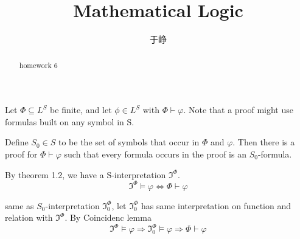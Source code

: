 \documentclass{ximera}
\begin{document}
\title{Mathematical Logic}
\author{于峥}

\begin{abstract}
    homework 6
\end{abstract}
\maketitle

\begin{problem} Let $\Phi \subseteq L^S$ be finite, and let $ϕ \in L^S$ with $\Phi \vdash \varphi$. Note that a proof might use formulas built on any symbol in S.
    
    Define $S_0 \in S$ to be the set of symbols that occur in $\Phi$ and $\varphi$. Then there is a proof for $\Phi \vdash \varphi$
    such that every formula occurs in the proof is an $S_0$-formula.
    \begin{solution}
        By theorem 1.2, we have a S-interpretation $\mathfrak{I}^{\Phi}$.
        $$
            \mathfrak{I}^{\Phi} \models \varphi \Longleftrightarrow \Phi \vdash \varphi
        $$
        
        same as $S_0$-interpretation $\mathfrak{I}^{\Phi}_0$, let $\mathfrak{I}^{\Phi}_0$ has same interpretation on function and relation with $\mathfrak{I}^{\Phi}$.
        By Coincidenc lemma
        $$
            \mathfrak{I}^{\Phi} \models \varphi \Longrightarrow \mathfrak{I}^{\Phi}_0  \models \varphi \Longrightarrow \Phi \vdash \varphi
        $$
    \end{solution}
\end{problem}
\end{document}
